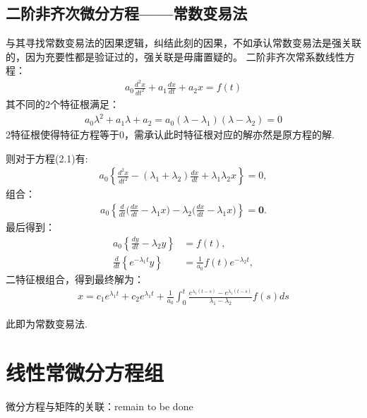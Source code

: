 \documentclass[12pt, a4paper, oneside]{ctexbook}
\begin{document}
        \section{二阶非齐次微分方程——常数变易法}
        与其寻找常数变易法的因果逻辑，纠结此刻的因果，不如承认常数变易法是强关联的，因为充要性都是验证过的，强关联是毋庸置疑的。
        二阶非齐次常系数线性方程：
        \begin{align}
            a_0\frac{d^2x}{dt^2}+a_1\frac{dx}{dt}+a_{2}x=f(t)
        \end{align}
        其不同的2个特征根满足：
        \begin{align}
            a_0\lambda^2+a_1\lambda+a_{2}=a_0(\lambda-\lambda_1)(\lambda-\lambda_2)=0
        \end{align}
        2特征根使得特征方程等于0，需承认此时特征根对应的解亦然是原方程的解.\par
        则对于方程(2.1)有:
        \begin{align}
            a_{0}\left\{\frac{d^{2}x}{dt^{2}}-(\lambda_{1}+\lambda_{2})\frac{dx}{dt}+\lambda_{1}\lambda_{2}x\right\}=0,
        \end{align}
        组合：
        \begin{align}
            a_{0}\left\{\frac{d}{dt}\Big(\frac{dx}{dt}-\lambda_{1}x\Big)-\lambda_{2}\Big(\frac{dx}{dt}-\lambda_{1}x\Big)\right\}=\mathbf{0}.
        \end{align}
        最后得到：
        \begin{align}
            a_{0}\left\{\frac{dy}{dt}-\lambda_{2}y\right\}&=f\left(t\right),\\\frac{d}{dt}\left\{e^{-\lambda_{1}t}y\right\}&=\frac{1}{a_{0}}f\left(t\right)e^{-\lambda_{2}t},
        \end{align}
        二特征根组合，得到最终解为：
        \begin{align}
            x=c_{1}e^{\lambda_{1}t}+c_{2}e^{\lambda_{1}t}+\frac{1}{a_{0}}\int_{0}^{t}\frac{e^{\lambda_{1}(t-s)}-e^{\lambda_{1}(t-s)}}{\lambda_{1}-\lambda_{2}}f(s)ds
        \end{align}\par
        此即为常数变易法.
\chapter{线性常微分方程组}
微分方程与矩阵的关联：remain to be done
\end{document}
